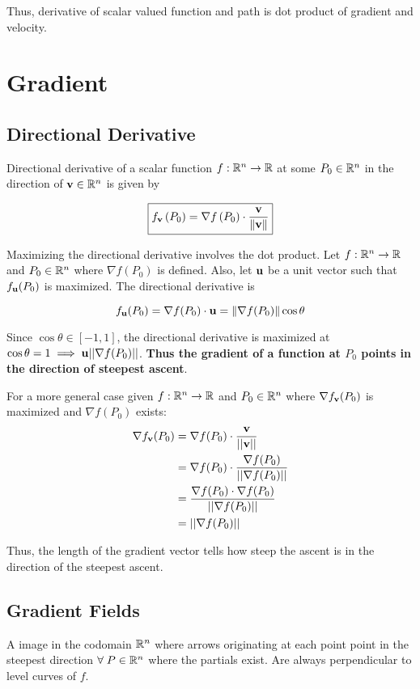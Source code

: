 Thus, derivative of scalar valued function and path is dot product of gradient and velocity.

\section{Gradient}

\subsection{Directional Derivative}

Directional derivative of a scalar function $f:\mathbb{R}^n\to \mathbb{R}$ at some $P_0\in\mathbb{R}^n$ in the direction of $\textbf{v}\in\mathbb{R}^n$ is given by

\[\boxed{f_{\textbf{v}}\left(P_{0}\right)=\nabla f\left(P_{0}\right) \cdot \frac{\textbf{v}}{\|\textbf{v}\|}}\]

Maximizing the directional derivative involves the dot product. Let $f:\mathbb{R}^n\to \mathbb{R}$ and $P_0\in\mathbb{R}^n$ where $\nabla f(P_0)$ is defined.
Also, let $\textbf{u}$ be a unit vector such that $f_{\textbf{u}}(P_0)$ is maximized. The directional derivative is

\[f_{\textbf u}(P_0)=\nabla f(P_0)\cdot \textbf u=\|\nabla f(P_0)\|\cos \theta\]

Since $\cos\theta \in [-1,1]$, the directional derivative is maximized at $\cos\theta = 1\implies \textbf{u}||\nabla f(P_0)||$.
\textbf{Thus the gradient of a function at $P_0$ points in the direction of steepest ascent}.

For a more general case given $f:\mathbb{R}^n\to \mathbb{R}$ and $P_0\in\mathbb{R}^n$ where $\nabla f_{\textbf{v}}(P_0)$ is maximized and $\nabla f(P_0)$ exists:
\begin{align*}
    \nabla f_{\textbf{v}}(P_0)&=\nabla f(P_0) \cdot \frac{\textbf{v}}{||\textbf{v}||}\\
    &=\nabla f(P_0) \cdot \frac{\nabla f(P_0)}{||\nabla f(P_0)||}\\
    &=\frac{\nabla f(P_0)\cdot \nabla f(P_0)}{||\nabla f(P_0)||}\\
    &=||\nabla f(P_0)||
\end{align*}

Thus, the length of the gradient vector tells how steep the ascent is in the direction of the steepest ascent.

\subsection{Gradient Fields}

A image in the codomain $\mathbb{R}^n$ where arrows originating at each point point in the steepest direction $\forall\; P\in \mathbb{R}^n$ where the partials exist.
Are always perpendicular to level curves of $f$.

